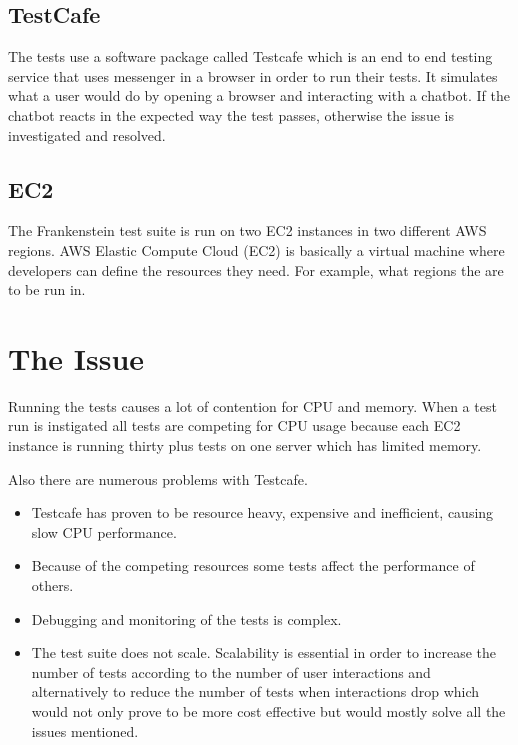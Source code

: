 \documentclass[12pt,a4paper,titlepage]{report}
\begin{document}
\subsection{TestCafe}
The tests use a software package called Testcafe which is an end to end testing service that uses messenger in a browser in order to run their tests. It simulates what a user would do by opening a browser and interacting with a chatbot. If the chatbot reacts in the expected way the test passes, otherwise the issue is investigated and resolved.
\subsection{EC2}
The Frankenstein test suite is run on two EC2 instances in two different AWS regions. AWS Elastic Compute Cloud (EC2) is basically a virtual machine where developers can define the resources they need. For example, what regions the are to be run in. 
\section{The Issue}

Running the tests causes a lot of contention for CPU and memory. When a test run is instigated all tests are competing for CPU usage because each EC2 instance is running thirty plus tests on one server which has limited memory.

Also there are numerous problems with Testcafe. 
\begin{itemize}
  \item Testcafe has proven to be resource heavy, expensive and inefficient, causing slow CPU performance. 
  \item Because of the competing resources some tests affect the performance of others. 
  \item Debugging and monitoring of the tests is complex.
  \item The test suite does not scale. Scalability is essential in order to increase the number of tests according to the number of user interactions and alternatively to reduce the number of tests when interactions drop which would not only prove to be more cost effective but would mostly solve all the issues mentioned.
\end{itemize}
\end{document}
